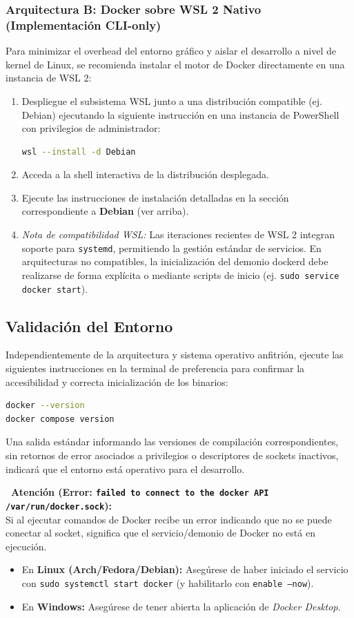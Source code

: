 \documentclass[11pt,a4paper]{article}
\begin{document}
\subsubsection{Arquitectura B: Docker sobre WSL 2 Nativo (Implementación CLI-only)}
Para minimizar el overhead del entorno gráfico y aislar el desarrollo a nivel de kernel de Linux, se recomienda instalar el motor de Docker directamente en una instancia de WSL 2:
\begin{enumerate}
    \item Despliegue el subsistema WSL junto a una distribución compatible (ej. Debian) ejecutando la siguiente instrucción en una instancia de PowerShell con privilegios de administrador:
\begin{lstlisting}[language=bash]
wsl --install -d Debian
\end{lstlisting}
    \item Acceda a la shell interactiva de la distribución desplegada.
    \item Ejecute las instrucciones de instalación detalladas en la sección correspondiente a \textbf{Debian} (ver arriba).
    \item \textit{Nota de compatibilidad WSL:} Las iteraciones recientes de WSL 2 integran soporte para \texttt{systemd}, permitiendo la gestión estándar de servicios. En arquitecturas no compatibles, la inicialización del demonio dockerd debe realizarse de forma explícita o mediante scripts de inicio (ej. \texttt{sudo service docker start}).
\end{enumerate}

\subsection{Validación del Entorno}
Independientemente de la arquitectura y sistema operativo anfitrión, ejecute las siguientes instrucciones en la terminal de preferencia para confirmar la accesibilidad y correcta inicialización de los binarios:
\begin{lstlisting}[language=bash]
docker --version
docker compose version
\end{lstlisting}
Una salida estándar informando las versiones de compilación correspondientes, sin retornos de error asociados a privilegios o descriptores de sockets inactivos, indicará que el entorno está operativo para el desarrollo.

\vspace{0.5cm}
\noindent\textbf{\textwarning\ Atención (Error: \texttt{failed to connect to the docker API /var/run/docker.sock}):} \\
Si al ejecutar comandos de Docker recibe un error indicando que no se puede conectar al socket, significa que el servicio/demonio de Docker no está en ejecución. 
\begin{itemize}
    \item En \textbf{Linux (Arch/Fedora/Debian):} Asegúrese de haber iniciado el servicio con \texttt{sudo systemctl start docker} (y habilitarlo con \texttt{enable --now}).
    \item En \textbf{Windows:} Asegúrese de tener abierta la aplicación de \textit{Docker Desktop}.
\end{itemize}
\end{document}
